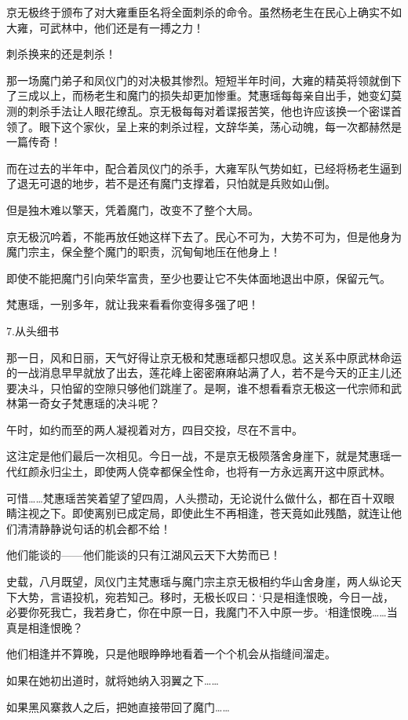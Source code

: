 京无极终于颁布了对大雍重臣名将全面刺杀的命令。虽然杨老生在民心上确实不如大雍，可武林中，他们还是有一搏之力！

刺杀换来的还是刺杀！

那一场魔门弟子和凤仪门的对决极其惨烈。短短半年时间，大雍的精英将领就倒下了三成以上，而杨老生和魔门的损失却更加惨重。梵惠瑶每每亲自出手，她变幻莫测的刺杀手法让人眼花缭乱。京无极每每对着谍报苦笑，他也许应该换一个密谍首领了。眼下这个家伙，呈上来的刺杀过程，文辞华美，荡心动魄，每一次都赫然是一篇传奇！

而在过去的半年中，配合着凤仪门的杀手，大雍军队气势如虹，已经将杨老生逼到了退无可退的地步，若不是还有魔门支撑着，只怕就是兵败如山倒。

但是独木难以擎天，凭着魔门，改变不了整个大局。

京无极沉吟着，不能再放任她这样下去了。民心不可为，大势不可为，但是他身为魔门宗主，保全整个魔门的职责，沉甸甸地压在他身上！

即使不能把魔门引向荣华富贵，至少也要让它不失体面地退出中原，保留元气。

梵惠瑶，一别多年，就让我来看看你变得多强了吧！

7.从头细书

那一日，风和日丽，天气好得让京无极和梵惠瑶都只想叹息。这关系中原武林命运的一战消息早早就放了出去，莲花峰上密密麻麻站满了人，若不是今天的正主儿还要决斗，只怕留的空隙只够他们跳崖了。是啊，谁不想看看京无极这一代宗师和武林第一奇女子梵惠瑶的决斗呢？

午时，如约而至的两人凝视着对方，四目交投，尽在不言中。

这注定是他们最后一次相见。今日一战，不是京无极陨落舍身崖下，就是梵惠瑶一代红颜永归尘土，即使两人侥幸都保全性命，也将有一方永远离开这中原武林。

可惜……梵惠瑶苦笑着望了望四周，人头攒动，无论说什么做什么，都在百十双眼睛注视之下。即使离别已成定局，即使此生不再相逢，苍天竟如此残酷，就连让他们清清静静说句话的机会都不给！

他们能谈的——他们能谈的只有江湖风云天下大势而已！

史载，八月既望，凤仪门主梵惠瑶与魔门宗主京无极相约华山舍身崖，两人纵论天下大势，言语投机，宛若知己。移时，无极长叹曰：‘只是相逢恨晚，今日一战，必要你死我亡，我若身亡，你在中原一日，我魔门不入中原一步。‘相逢恨晚……当真是相逢恨晚？

他们相逢并不算晚，只是他眼睁睁地看着一个个机会从指缝间溜走。

如果在她初出道时，就将她纳入羽翼之下……

如果黑风寨救人之后，把她直接带回了魔门……

